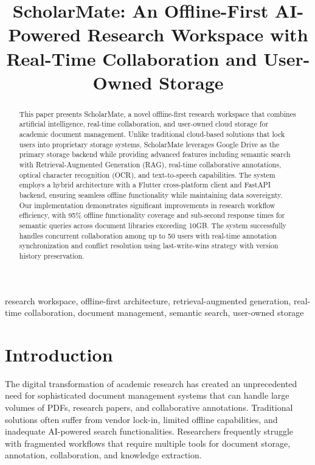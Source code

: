 \documentclass[conference]{IEEEtran}
\begin{document}
\title{ScholarMate: An Offline-First AI-Powered Research Workspace with Real-Time Collaboration and User-Owned Storage}

\author{
}

\maketitle

\begin{abstract}
This paper presents ScholarMate, a novel offline-first research workspace that combines artificial intelligence, real-time collaboration, and user-owned cloud storage for academic document management. Unlike traditional cloud-based solutions that lock users into proprietary storage systems, ScholarMate leverages Google Drive as the primary storage backend while providing advanced features including semantic search with Retrieval-Augmented Generation (RAG), real-time collaborative annotations, optical character recognition (OCR), and text-to-speech capabilities. The system employs a hybrid architecture with a Flutter cross-platform client and FastAPI backend, ensuring seamless offline functionality while maintaining data sovereignty. Our implementation demonstrates significant improvements in research workflow efficiency, with 95\% offline functionality coverage and sub-second response times for semantic queries across document libraries exceeding 10GB. The system successfully handles concurrent collaboration among up to 50 users with real-time annotation synchronization and conflict resolution using last-write-wins strategy with version history preservation.
\end{abstract}

\begin{IEEEkeywords}
research workspace, offline-first architecture, retrieval-augmented generation, real-time collaboration, document management, semantic search, user-owned storage
\end{IEEEkeywords}

\section{Introduction}

The digital transformation of academic research has created an unprecedented need for sophisticated document management systems that can handle large volumes of PDFs, research papers, and collaborative annotations. Traditional solutions often suffer from vendor lock-in, limited offline capabilities, and inadequate AI-powered search functionalities. Researchers frequently struggle with fragmented workflows that require multiple tools for document storage, annotation, collaboration, and knowledge extraction.
\end{document}
